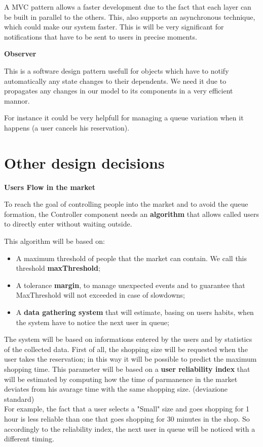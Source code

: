 A MVC pattern allows a faster development due to the fact that each layer can be built in parallel to the others. This, also supports an asynchronous technique, which could make our system faster. This is will be very significant for notifications that have to be sent to users in precise moments.\\
\par
\textbf{Observer} \par
This is a software design pattern usefull for objects which have to notify automatically any state changes to their dependents. We need it due to propagates any changes in our model to its components in a very efficient mannor.

For instance it could be very helpfull for managing a queue variation when it happens (a user cancels his reservation).


\section{Other design decisions}
\textbf{Users Flow in the market} \par
To reach the goal of controlling people into the market and to avoid the queue formation, the Controller component needs an \textbf{algorithm} that allows called users to directly enter without waiting outside. 

This algorithm will be based on:
\begin{itemize}
\item A maximum threshold of people that the market can contain. We call this threshold \textbf{maxThreshold};
\item A tolerance \textbf{margin}, to manage unexpected events and to guarantee that MaxThreshold will not  exceeded in case of slowdowns;
\item A \textbf{data gathering system} that will estimate, basing on users habits, when the system have to notice the next user in queue;
\end{itemize}


The system will be based on informations entered by the users and by statistics of the collected data.
First of all, the shopping size will be requested when the user takes the reservation; in this way it will be possible to predict the maximum shopping time. 
This parameter will be based on a \textbf{user reliability index} that will be estimated by computing how the time of parmanence in the market deviates from his avarage time with the same shopping size. (deviazione standard) \\
For example, the fact that a user selects a "Small" size and goes shopping for 1 hour is less reliable than one that goes shopping for 30 minutes in the shop.
So accordingly to the reliability index, the next user in queue will be noticed with a different timing.

